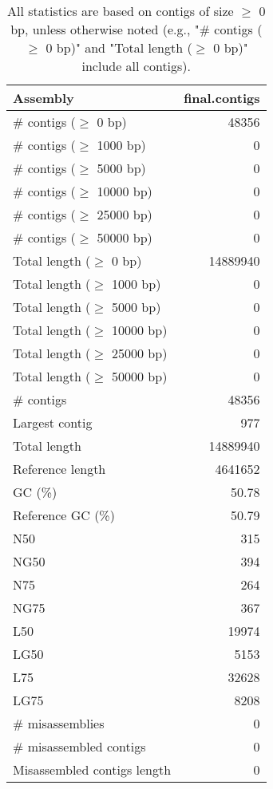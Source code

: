 \documentclass[12pt,a4paper]{article}
\begin{document}
\begin{table}[ht]
\begin{center}
\caption{All statistics are based on contigs of size $\geq$ 0 bp, unless otherwise noted (e.g., "\# contigs ($\geq$ 0 bp)" and "Total length ($\geq$ 0 bp)" include all contigs).}
\begin{tabular}{|l*{1}{|r}|}
\hline
Assembly & final.contigs \\ \hline
\# contigs ($\geq$ 0 bp) & 48356 \\ \hline
\# contigs ($\geq$ 1000 bp) & 0 \\ \hline
\# contigs ($\geq$ 5000 bp) & 0 \\ \hline
\# contigs ($\geq$ 10000 bp) & 0 \\ \hline
\# contigs ($\geq$ 25000 bp) & 0 \\ \hline
\# contigs ($\geq$ 50000 bp) & 0 \\ \hline
Total length ($\geq$ 0 bp) & 14889940 \\ \hline
Total length ($\geq$ 1000 bp) & 0 \\ \hline
Total length ($\geq$ 5000 bp) & 0 \\ \hline
Total length ($\geq$ 10000 bp) & 0 \\ \hline
Total length ($\geq$ 25000 bp) & 0 \\ \hline
Total length ($\geq$ 50000 bp) & 0 \\ \hline
\# contigs & 48356 \\ \hline
Largest contig & 977 \\ \hline
Total length & 14889940 \\ \hline
Reference length & 4641652 \\ \hline
GC (\%) & 50.78 \\ \hline
Reference GC (\%) & 50.79 \\ \hline
N50 & 315 \\ \hline
NG50 & 394 \\ \hline
N75 & 264 \\ \hline
NG75 & 367 \\ \hline
L50 & 19974 \\ \hline
LG50 & 5153 \\ \hline
L75 & 32628 \\ \hline
LG75 & 8208 \\ \hline
\# misassemblies & 0 \\ \hline
\# misassembled contigs & 0 \\ \hline
Misassembled contigs length & 0 \\ \hline

\end{tabular}
\end{center}
\end{table}
\end{document}
